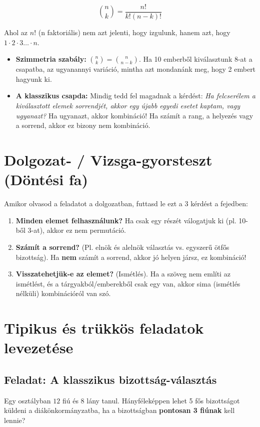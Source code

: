 \documentclass[11pt,a4paper]{article}
\begin{document}
{$$\binom{n}{k} = \frac{n!}{k!(n-k)!}$$

Ahol az $n!$ (n faktoriális) nem azt jelenti, hogy izgulunk, hanem azt, hogy $1 \cdot 2 \cdot 3 \dots \cdot n$.

\begin{tcolorbox}[title=Hasznos tulajdonságok és csapdák]
\begin{itemize}
    \item \textbf{Szimmetria szabály:} $\binom{n}{k} = \binom{n}{n-k}$. Ha 10 emberből kiválasztunk 8-at a csapatba, az ugyanannyi variáció, mintha azt mondanánk meg, hogy 2 embert hagyunk ki.
    \item \textbf{A klasszikus csapda:} Mindig tedd fel magadnak a kérdést: \textit{Ha felcserélem a kiválasztott elemek sorrendjét, akkor egy újabb egyedi esetet kaptam, vagy ugyanazt?} Ha ugyanazt, akkor kombináció! Ha számít a rang, a helyezés vagy a sorrend, akkor ez bizony nem kombináció.
\end{itemize}
\end{tcolorbox}

\section{Dolgozat- / Vizsga-gyorsteszt (Döntési fa)}
Amikor olvasod a feladatot a dolgozatban, futtasd le ezt a 3 kérdést a fejedben:
\begin{enumerate}
    \item \textbf{Minden elemet felhasználunk?} Ha csak egy részét válogatjuk ki (pl. 10-ből 3-at), akkor ez nem permutáció.
    \item \textbf{Számít a sorrend?} (Pl. elnök és alelnök választás vs. egyszerű ötfős bizottság). Ha \textbf{nem} számít a sorrend, akkor jó helyen jársz, ez kombináció!
    \item \textbf{Visszatehetjük-e az elemet?} (Ismétlés). Ha a szöveg nem említi az ismétlést, és a tárgyakból/emberekből csak egy van, akkor sima (ismétlés nélküli) kombinációról van szó.
\end{enumerate}

\section{Tipikus és trükkös feladatok levezetése}

\subsection*{Feladat: A klasszikus bizottság-választás}
\begin{tcolorbox}
Egy osztályban $12$ fiú és $8$ lány tanul. Hányféleképpen lehet 5 fős bizottságot küldeni a diákönkormányzatba, ha a bizottságban \textbf{pontosan 3 fiúnak} kell lennie?
\end{tcolorbox}

}
\end{document}
